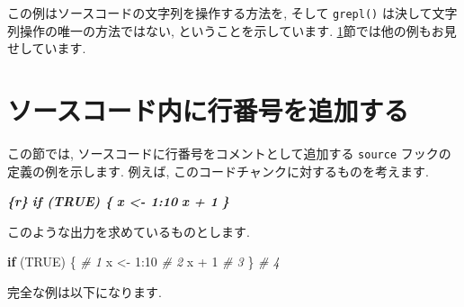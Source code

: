 \documentclass[
  11pt,
  lualatex,
  ja=standard]{bxjsreport}
\newenvironment{Shaded}{\begin{snugshade}}{\end{snugshade}}
\newcommand{\CommentTok}[1]{\textcolor[rgb]{0.56,0.35,0.01}{\textit{#1}}}
\newcommand{\ConstantTok}[1]{\textcolor[rgb]{0.00,0.00,0.00}{#1}}
\newcommand{\ControlFlowTok}[1]{\textcolor[rgb]{0.13,0.29,0.53}{\textbf{#1}}}
\newcommand{\DecValTok}[1]{\textcolor[rgb]{0.00,0.00,0.81}{#1}}
\newcommand{\InformationTok}[1]{\textcolor[rgb]{0.56,0.35,0.01}{\textbf{\textit{#1}}}}
\newcommand{\NormalTok}[1]{#1}
\newcommand{\OtherTok}[1]{\textcolor[rgb]{0.56,0.35,0.01}{#1}}
\newcommand{\SpecialCharTok}[1]{\textcolor[rgb]{0.00,0.00,0.00}{#1}}
\begin{document}
この例はソースコードの文字列を操作する方法を, そして \texttt{grepl()} は決して文字列操作の唯一の方法ではない, ということを示しています. \ref{hook-number}節では他の例もお見せしています.

\hypertarget{hook-number}{%
\section{ソースコード内に行番号を追加する}\label{hook-number}}

この節では, ソースコードに行番号をコメントとして追加する \texttt{source} フックの定義の例を示します. 例えば, このコードチャンクに対するものを考えます.

\begin{Shaded}
\begin{Highlighting}[]
\InformationTok{\textasciigrave{}\textasciigrave{}\textasciigrave{}\{r\}}
\InformationTok{if (TRUE) \{}
\InformationTok{  x \textless{}{-} 1:10}
\InformationTok{  x + 1}
\InformationTok{\}}
\InformationTok{\textasciigrave{}\textasciigrave{}\textasciigrave{}}
\end{Highlighting}
\end{Shaded}

このような出力を求めているものとします.

\begin{Shaded}
\begin{Highlighting}[numbers=left,,]
\ControlFlowTok{if}\NormalTok{ (}\ConstantTok{TRUE}\NormalTok{) \{    }\CommentTok{\# 1}
\NormalTok{  x }\OtherTok{\textless{}{-}} \DecValTok{1}\SpecialCharTok{:}\DecValTok{10}    \CommentTok{\# 2}
\NormalTok{  x }\SpecialCharTok{+} \DecValTok{1}        \CommentTok{\# 3}
\NormalTok{\}              }\CommentTok{\# 4}
\end{Highlighting}
\end{Shaded}

完全な例は以下になります.
\end{document}
